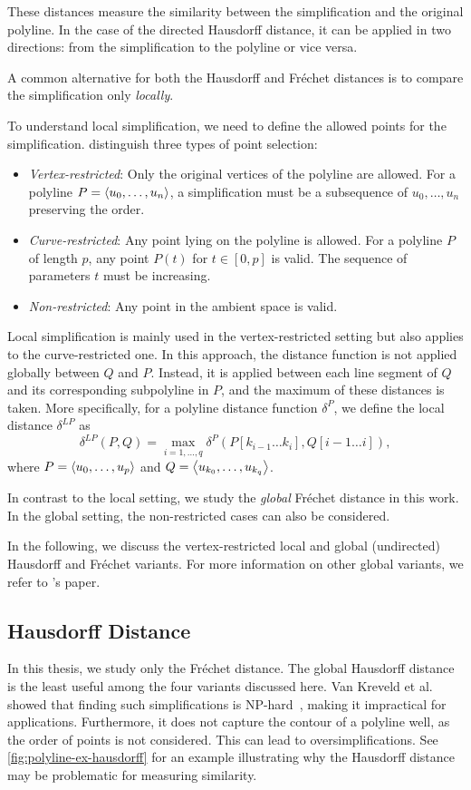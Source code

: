 These distances measure the similarity between the simplification and the original polyline. In the case of the directed Hausdorff distance, it can be applied in two directions: from the simplification to the polyline or vice versa.

A common alternative for both the Hausdorff and Fréchet distances is to compare the simplification only \emph{locally}.

To understand local simplification, we need to define the allowed points for the simplification.  distinguish three types of point selection:
\begin{itemize}
  \item \emph{Vertex-restricted}: Only the original vertices of the polyline are allowed. For a polyline \(P = \left\langle u_0, \dots, u_n\right\rangle\), a simplification must be a subsequence of \(u_0, \dots, u_n\) preserving the order.
	\item \emph{Curve-restricted}: Any point lying on the polyline is allowed. For a polyline \(P\) of length \(p\), any point \(P(t)\) for \(t \in [0, p]\) is valid. The sequence of parameters \(t\) must be increasing.
	\item \emph{Non-restricted}: Any point in the ambient space is valid.
\end{itemize}

Local simplification is mainly used in the vertex-restricted setting but also applies to the curve-restricted one. In this approach, the distance function is not applied globally between \(Q\) and \(P\). Instead, it is applied between each line segment of \(Q\) and its corresponding subpolyline in \(P\), and the maximum of these distances is taken. More specifically, for a polyline distance function \(\delta^P\), we define the local distance \(\delta^{LP}\) as
\[\delta^{LP}(P, Q) = \max_{i = 1, \dots, q} \delta^P(P[k_{i-1}\dots k_i], Q[i-1 \dots i]),\]
where \(P = \left\langle u_0, \dots, u_p\right\rangle\) and \(Q = \left\langle u_{k_0}, \dots, u_{k_q}\right\rangle\).

In contrast to the local setting, we study the \emph{global} Fréchet distance in this work. In the global setting, the non-restricted cases can also be considered.

In the following, we discuss the vertex-restricted local and global (undirected) Hausdorff and Fréchet variants. For more information on other global variants, we refer to \citeauthor{global_curve_simplification}'s paper.

\subsection{Hausdorff Distance}
In this thesis, we study only the Fréchet distance. The global Hausdorff distance is the least useful among the four variants discussed here. Van Kreveld et al. showed that finding such simplifications is NP-hard~\cite{on_optimal_polyline_simplification_using_the_hausdorff_and_frechet_distance}, making it impractical for applications. Furthermore, it does not capture the contour of a polyline well, as the order of points is not considered. This can lead to oversimplifications. See \cref{fig:polyline-ex-hausdorff} for an example illustrating why the Hausdorff distance may be problematic for measuring similarity.

